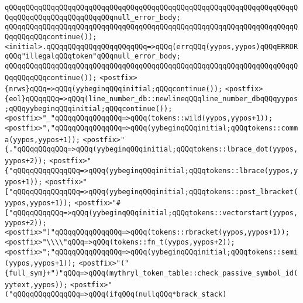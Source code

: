\verb|qQQqqQQqqQQqqQQqqQQqqQQqqQQqqQQqqQQqqQQqqQQqqQQqqQQqqQQqqQQqqQQqqQQqqQQqqQQqqQQqqQQqqQQqqQQqqQQqnull_error_body;|\newline
\verb|qQQqqQQqqQQqqQQqqQQqqQQqqQQqqQQqqQQqqQQqqQQqqQQqqQQqqQQqqQQqqQQqqQQqqQQqqQQqqQQqcontinue());|\newline
\verb|<initial>.qQQqqQQqqQQqqQQqqQQqqQQq=>qQQq(errqQQq(yypos,yypos)qQQqERRORqQQq"illegalqQQqtoken"qQQqnull_error_body;|\newline
\verb|qQQqqQQqqQQqqQQqqQQqqQQqqQQqqQQqqQQqqQQqqQQqqQQqqQQqqQQqqQQqqQQqqQQqqQQqqQQqqQQqcontinue());|\newline
\newline
\newline
\verb|<postfix>{nrws}qQQq=>qQQq(yybeginqQQqinitial;qQQqcontinue());|\newline
\verb|<postfix>{eol}qQQqqQQq=>qQQq(line_number_db::newlineqQQqline_number_dbqQQqyypos;qQQqyybeginqQQqinitial;qQQqcontinue());|\newline
\verb|<postfix>"_"qQQqqQQqqQQqqQQq=>qQQq(tokens::wild(yypos,yypos+1));|\newline
\verb|<postfix>","qQQqqQQqqQQqqQQq=>qQQq(yybeginqQQqinitial;qQQqtokens::comma(yypos,yypos+1));|\newline
\verb|<postfix>"{."qQQqqQQqqQQq=>qQQq(yybeginqQQqinitial;qQQqtokens::lbrace_dot(yypos,yypos+2));|\newline
\verb|<postfix>"{"qQQqqQQqqQQqqQQq=>qQQq(yybeginqQQqinitial;qQQqtokens::lbrace(yypos,yypos+1));|\newline
\verb|<postfix>"["qQQqqQQqqQQqqQQq=>qQQq(yybeginqQQqinitial;qQQqtokens::post_lbracket(yypos,yypos+1));|\newline
\verb|<postfix>"#["qQQqqQQqqQQq=>qQQq(yybeginqQQqinitial;qQQqtokens::vectorstart(yypos,yypos+2));|\newline
\verb|<postfix>"]"qQQqqQQqqQQqqQQq=>qQQq(tokens::rbracket(yypos,yypos+1));|\newline
\verb|<postfix>"\\\\"qQQq=>qQQq(tokens::fn_t(yypos,yypos+2));|\newline
\verb|<postfix>";"qQQqqQQqqQQqqQQq=>qQQq(yybeginqQQqinitial;qQQqtokens::semi(yypos,yypos+1));|\newline
\verb|<postfix>"("{full_sym}+")"qQQq=>qQQq(mythryl_token_table::check_passive_symbol_id(yytext,yypos));|\newline
\verb|<postfix>"("qQQqqQQqqQQqqQQq=>qQQq(ifqQQq(nullqQQq*brack_stack)|\newline

